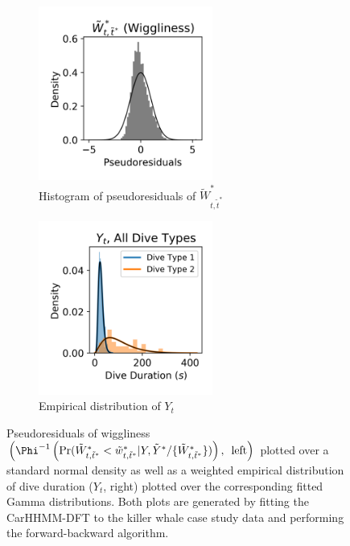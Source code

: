 \begin{figure}[ht]
    \begin{subfigure}{0.45\textwidth}
    	\centering
    	\includegraphics[width=2.25in]{../Plots/CarHHMM2_psedoresids_ahat.png}
    	\caption{Histogram of pseudoresiduals of $\tilde W^*_{t,\tilde t^*}$}
    	\label{fig:pseudoresids}
    \end{subfigure}
    \begin{subfigure}{0.45\textwidth}
    	\centering
    	\includegraphics[width=2.25in]{../Plots/CarHHMM2_empirical_hist_dive_duration.png}
    	\caption{Empirical distribution of $Y_t$}
    	\label{fig:empirical_dist}
    \end{subfigure}
    \caption{Pseudoresiduals of wiggliness $\left(\Phi^{-1} \left(\Pr(\Ztwo_{t,\tilde t^*} < \ztwo_{t,\tilde t^*}|Y,\tilde Y^* / \{\Ztwo_{t,\tilde t^*}\}) \right), \enspace \text{left} \right)$ plotted over a standard normal density as well as a weighted empirical distribution of dive duration ($Y_t$, right) plotted over the corresponding fitted Gamma distributions. Both plots are generated by fitting the CarHHMM-DFT to the killer whale case study data and performing the forward-backward algorithm.}
    \label{fig:model_checking}
\end{figure}


